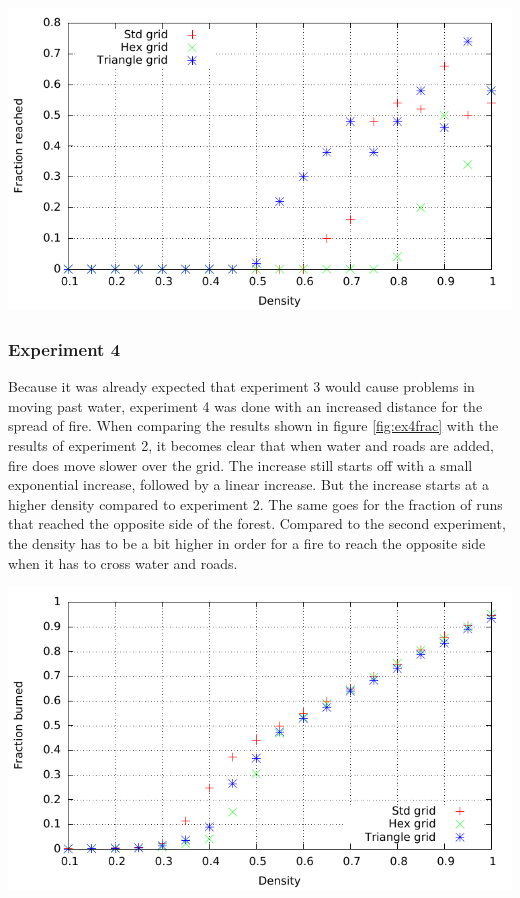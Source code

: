 \documentclass{article}
\newenvironment{Figure}
  {\par\medskip\noindent\minipage{\linewidth}}
  {\endminipage\par\medskip}
\begin{document}
\begin{multicols}{2}
\begin{Figure}
 \centering
 \includegraphics[width=\textwidth]{imgs/plot/ex3/oppreached.pdf}
\label{fig:ex3opp}
\end{Figure}
\subsubsection*{Experiment 4}
Because it was already expected that experiment 3 would cause problems in moving past water, experiment 4 was done with an increased distance for the spread of fire. When comparing the results shown in figure \ref{fig:ex4frac} with the results of experiment 2, it becomes clear that when water and roads are added, fire does move slower over the grid. The increase still starts off with a small exponential increase, followed by a linear increase. But the increase starts at a higher density compared to experiment 2. The same goes for the fraction of runs that reached the opposite side of the forest. Compared to the second experiment, the density has to be a bit higher in order for a fire to reach the opposite side when it has to cross water and roads.

\begin{Figure}
 \centering
 \includegraphics[width=\textwidth]{imgs/plot/ex4/fracburned.pdf}
\label{fig:ex4frac}
\end{Figure}

\end{multicols}
\end{document}
